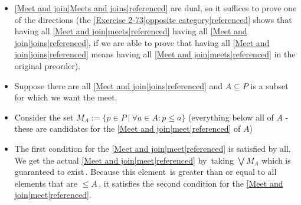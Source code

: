 \begin{itemize}
    \item  \ref{Meet and join|Meets and joins|referenced} are dual, so it suffices to prove one of the directions (the \ref{Exercise 2-73|opposite category|referenced} shows that having all \ref{Meet and join|meets|referenced} having all \ref{Meet and join|joins|referenced}, if we are able to prove that having all \ref{Meet and join|joins|referenced} means having all \ref{Meet and join|meets|referenced} in the original preorder).
    \item Suppose there are all \ref{Meet and join|joins|referenced} and $A \subseteq P$ is a subset for which we want the meet.
    \item Consider the set $M_A := \{p \in P\ |\ \forall a \in A: p \leq a \}$ (everything below all of $A$ - these are candidates for the \ref{Meet and join|meet|referenced} of $A$)
    \item The first condition for the \ref{Meet and join|meet|referenced} is satisfied by all. We get the actual \ref{Meet and join|meet|referenced} by \,taking $\bigvee M_A$ which is guaranteed to exist\,. Because this element \,is greater than or equal to all elements that are $\leq A$\,, it satisfies the second condition for the \ref{Meet and join|meet|referenced}.
  \end{itemize}
